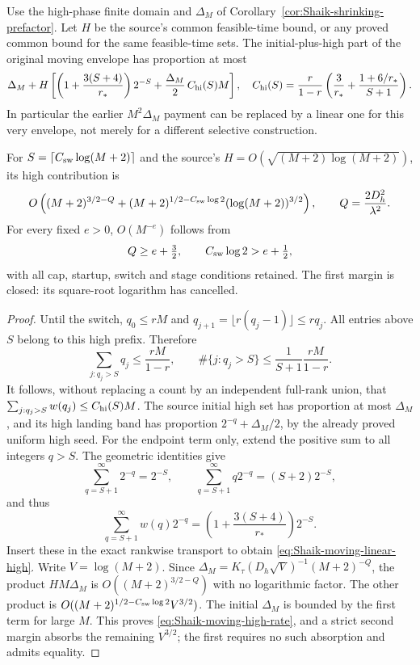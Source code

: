 \begin{corollary}
\label{cor:Shaik-moving-linear-high}
Use the high-phase finite domain and \(\Delta_M\) of
Corollary~\ref{cor:Shaik-shrinking-prefactor}. Let \(H\) be the source's
common feasible-time bound, or any proved common bound for the
same feasible-time sets. The initial-plus-high part of the original
moving envelope has proportion at most
\begin{equation}\label{eq:Shaik-moving-linear-high}
 \Delta_M+H\left[
 \left(1+\frac{3(S+4)}{r_*}\right)2^{-S}
       +\frac{\Delta_M}{2}\,C_{\rm hi}(S)M\right],
 \quad
 C_{\rm hi}(S)=\frac r{1-r}
       \left(\frac3{r_*}+\frac{1+6/r_*}{S+1}\right).
\end{equation}
In particular the earlier \(M^2\Delta_M\) payment can be replaced
by a linear one for this very envelope, not merely for a different
selective construction.

For \(S=\lceil C_{\rm sw}\log(M+2)\rceil\) and the source's
\(H=O(\sqrt{(M+2)\log(M+2)})\), its high contribution is
\begin{equation}\label{eq:Shaik-moving-high-rate}
 O\left((M+2)^{3/2-Q}
       +(M+2)^{1/2-C_{\rm sw}\log2}
                     (\log(M+2))^{3/2}\right),
 \qquad Q=\frac{2D_h^2}{\lambda^2}.
\end{equation}
For every fixed \(e>0\), \(O(M^{-e})\) follows from
\begin{equation}\label{eq:Shaik-moving-high-closed-margin}
 Q\ge e+\tfrac32,\qquad C_{\rm sw}\log2>e+\tfrac12,
\end{equation}
with all cap, startup, switch and stage conditions retained.
The first margin is closed: its square-root logarithm has cancelled.
\end{corollary}
\begin{proof}
Until the switch, \(q_0\le rM\) and
\(q_{j+1}=\lfloor r(q_j-1)\rfloor\le rq_j\).
All entries above \(S\) belong to this high prefix. Therefore
\[
 \sum_{j:q_j>S}q_j\le\frac{rM}{1-r},
 \qquad
 \#\{j:q_j>S\}\le\frac1{S+1}\frac{rM}{1-r}.
\]
It follows, without replacing a count by an independent full-rank
union, that \(\sum_{j:q_j>S}w(q_j)\le C_{\rm hi}(S)M\).
The source initial high set has proportion at most \(\Delta_M\),
and its high landing band has proportion
\(2^{-q}+\Delta_M/2\), by the already proved uniform high seed.
For the endpoint term only, extend the positive sum to all integers
\(q>S\). The geometric identities give
\[
 \sum_{q=S+1}^\infty2^{-q}=2^{-S},\qquad
 \sum_{q=S+1}^\infty q2^{-q}=(S+2)2^{-S},
\]
and thus
\[
 \sum_{q=S+1}^\infty w(q)2^{-q}
       =\left(1+\frac{3(S+4)}{r_*}\right)2^{-S}.
\]
Insert these in the exact rankwise transport to obtain
\eqref{eq:Shaik-moving-linear-high}.
Write \(V=\log(M+2)\). Since
\(\Delta_M=K_\tau(D_h\sqrt V)^{-1}(M+2)^{-Q}\),
the product \(HM\Delta_M\) is
\(O((M+2)^{3/2-Q})\) with no logarithmic factor.
The other product is
\(O((M+2)^{1/2-C_{\rm sw}\log2}V^{3/2})\).
The initial \(\Delta_M\) is bounded by the first term for large \(M\).
This proves \eqref{eq:Shaik-moving-high-rate}, and a strict second
margin absorbs the remaining \(V^{3/2}\); the first requires no
such absorption and admits equality.
\end{proof}

